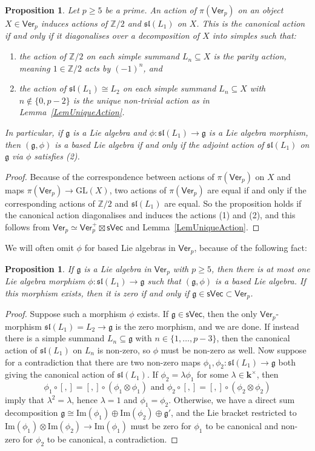\documentclass[11pt,a4paper,reqno]{amsart}
\newtheorem{prop}[theorem]{Proposition}
\theoremstyle{definition}
\newcommand{\bk}{\mathbf{k}}
\numberwithin{equation}{section}
\newcommand{\im}{\mathrm{Im}}
\newcommand{\Ver}{\mathsf{Ver}}
\newcommand{\mZ}{\mathbb{Z}}
\newcommand{\fg}{\mathfrak{g}}
\newcommand{\fsl}{\mathfrak{sl}}
\newcommand{\sVec}{\mathsf{sVec}}
\newcommand{\GL}{\mathrm{GL}}
\begin{document}
\begin{prop}\label{PropCanAction}
Let $p\geq5$ be a prime. An action of $\pi(\Ver_p)$ on an object $X\in\Ver_p$ induces actions of $\mZ/2$ and $\fsl(L_1)$ on $X$. This is the canonical action if and only if it diagonalises over a decomposition of $X$ into simples such that:
\begin{enumerate}
\item the action of $\mZ/2$ on each simple summand $L_n\subseteq X$ is the parity action, meaning $1\in\mZ/2$ acts by $(-1)^n$, and
\item the action of $\fsl(L_1)\cong L_2$ on each simple summand $L_n\subseteq X$ with $n\not\in\{0,p-2\}$ is the unique non-trivial action as in Lemma~\ref{LemUniqueAction}.
\end{enumerate}
In particular, if $\fg$ is a Lie algebra and $\phi:\fsl(L_1)\to\fg$ is a Lie algebra morphism, then $(\fg,\phi)$ is a based Lie algebra if and only if the adjoint action of $\fsl(L_1)$ on $\fg$ via $\phi$ satisfies (2).
\end{prop}

\begin{proof}
Because of the correspondence between actions of $\pi(\Ver_p)$ on $X$ and maps $\pi(\Ver_p)\to\GL(X)$, two actions of $\pi(\Ver_p)$ are equal if and only if the corresponding actions of $\mZ/2$ and $\fsl(L_1)$ are equal. So the proposition holds if the canonical action diagonalises and induces the actions (1) and (2), and this follows from $\Ver_p\simeq\Ver_p^+\boxtimes\sVec$ and Lemma~\ref{LemUniqueAction}.
\end{proof}

We will often omit $\phi$ for based Lie algebras in $\Ver_p$, because of the following fact:

\begin{prop}\label{PropUnique}
If $\fg$ is a Lie algebra in $\Ver_p$ with $p\geq5$, then there is at most one Lie algebra morphism $\phi:\fsl(L_1)\to\fg$ such that $(\fg,\phi)$ is a based Lie algebra. If this morphism exists, then it is zero if and only if $\fg\in\sVec\subset\Ver_p$.
\end{prop}

\begin{proof}
Suppose such a morphism $\phi$ exists. If $\fg\in\sVec$, then the only $\Ver_p$-morphism $\fsl(L_1)=L_2\to\fg$ is the zero morphism, and we are done. If instead there is a simple summand $L_n\subseteq\fg$ with $n\in\{1,\dots,p-3\}$, then the canonical action of $\fsl(L_1)$ on $L_n$ is non-zero, so $\phi$ must be non-zero as well. Now suppose for a contradiction that there are two non-zero maps $\phi_1,\phi_2:\fsl(L_1)\to\fg$ both giving the canonical action of $\fsl(L_1)$. If $\phi_2=\lambda\phi_1$ for some $\lambda\in\bk^\times$, then
\[\phi_1\circ[,]=[,]\circ(\phi_1\otimes\phi_1)\text{ and }\phi_2\circ[,]=[,]\circ(\phi_2\otimes\phi_2)\]
imply that $\lambda^2=\lambda$, hence $\lambda=1$ and $\phi_1=\phi_2$. Otherwise, we have a direct sum decomposition $\fg\cong \im(\phi_1)\oplus \im(\phi_2)\oplus\fg'$, and the Lie bracket restricted to $\im(\phi_1)\otimes \im(\phi_2)\to\im(\phi_1)$ must be zero for $\phi_1$ to be canonical and non-zero for $\phi_2$ to be canonical, a contradiction.
\end{proof}
\end{document}

